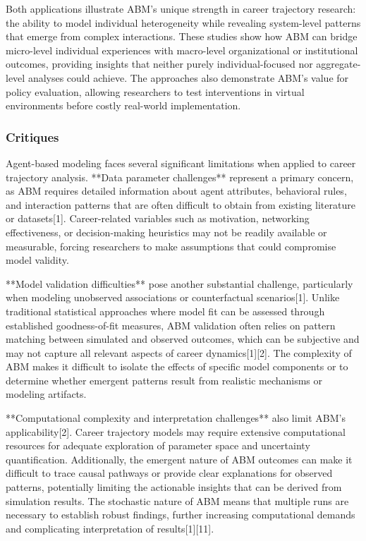 \documentclass[main.tex]{subfiles}
\begin{document}
Both applications illustrate ABM's unique strength in career trajectory research: the ability to model individual heterogeneity while revealing system-level patterns that emerge from complex interactions. These studies show how ABM can bridge micro-level individual experiences with macro-level organizational or institutional outcomes, providing insights that neither purely individual-focused nor aggregate-level analyses could achieve. The approaches also demonstrate ABM's value for policy evaluation, allowing researchers to test interventions in virtual environments before costly real-world implementation.

\subsubsection{Critiques}

Agent-based modeling faces several significant limitations when applied to career trajectory analysis. **Data parameter challenges** represent a primary concern, as ABM requires detailed information about agent attributes, behavioral rules, and interaction patterns that are often difficult to obtain from existing literature or datasets[1]. Career-related variables such as motivation, networking effectiveness, or decision-making heuristics may not be readily available or measurable, forcing researchers to make assumptions that could compromise model validity.

**Model validation difficulties** pose another substantial challenge, particularly when modeling unobserved associations or counterfactual scenarios[1]. Unlike traditional statistical approaches where model fit can be assessed through established goodness-of-fit measures, ABM validation often relies on pattern matching between simulated and observed outcomes, which can be subjective and may not capture all relevant aspects of career dynamics[1][2]. The complexity of ABM makes it difficult to isolate the effects of specific model components or to determine whether emergent patterns result from realistic mechanisms or modeling artifacts.

**Computational complexity and interpretation challenges** also limit ABM's applicability[2]. Career trajectory models may require extensive computational resources for adequate exploration of parameter space and uncertainty quantification. Additionally, the emergent nature of ABM outcomes can make it difficult to trace causal pathways or provide clear explanations for observed patterns, potentially limiting the actionable insights that can be derived from simulation results. The stochastic nature of ABM means that multiple runs are necessary to establish robust findings, further increasing computational demands and complicating interpretation of results[1][11].
\end{document}
